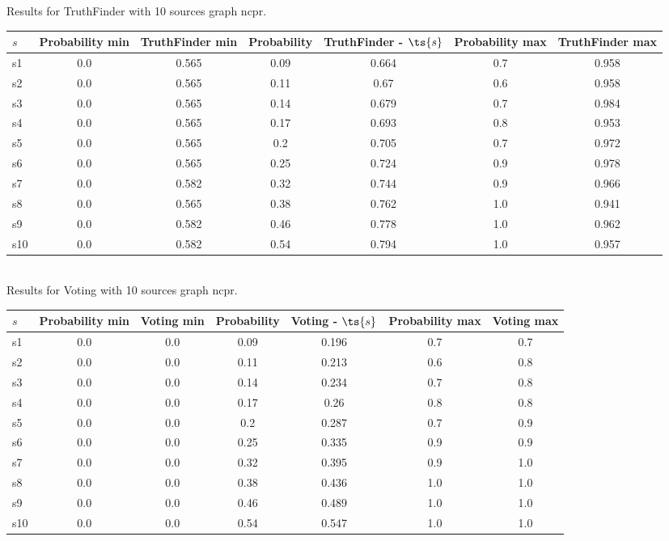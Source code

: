 \documentclass{article}
\begin{document}
\noindent Results for TruthFinder with 10 sources graph ncpr.

\noindent\begin{tabular}{|l|c|c|c|c|c|c|}
\hline
$s$& Probability min & TruthFinder min & Probability & TruthFinder - $\ts{s}$ & Probability max & TruthFinder max\\
\hline
s1 &0.0 & 0.565 & 0.09 & 0.664 & 0.7 & 0.958\\
\hline
s2 &0.0 & 0.565 & 0.11 & 0.67 & 0.6 & 0.958\\
\hline
s3 &0.0 & 0.565 & 0.14 & 0.679 & 0.7 & 0.984\\
\hline
s4 &0.0 & 0.565 & 0.17 & 0.693 & 0.8 & 0.953\\
\hline
s5 &0.0 & 0.565 & 0.2 & 0.705 & 0.7 & 0.972\\
\hline
s6 &0.0 & 0.565 & 0.25 & 0.724 & 0.9 & 0.978\\
\hline
s7 &0.0 & 0.582 & 0.32 & 0.744 & 0.9 & 0.966\\
\hline
s8 &0.0 & 0.565 & 0.38 & 0.762 & 1.0 & 0.941\\
\hline
s9 &0.0 & 0.582 & 0.46 & 0.778 & 1.0 & 0.962\\
\hline
s10 &0.0 & 0.582 & 0.54 & 0.794 & 1.0 & 0.957\\
\hline
\end{tabular}\\

\noindent Results for Voting with 10 sources graph ncpr.

\noindent\begin{tabular}{|l|c|c|c|c|c|c|}
\hline
$s$& Probability min & Voting min & Probability & Voting - $\ts{s}$ & Probability max & Voting max\\
\hline
s1 &0.0 & 0.0 & 0.09 & 0.196 & 0.7 & 0.7\\
\hline
s2 &0.0 & 0.0 & 0.11 & 0.213 & 0.6 & 0.8\\
\hline
s3 &0.0 & 0.0 & 0.14 & 0.234 & 0.7 & 0.8\\
\hline
s4 &0.0 & 0.0 & 0.17 & 0.26 & 0.8 & 0.8\\
\hline
s5 &0.0 & 0.0 & 0.2 & 0.287 & 0.7 & 0.9\\
\hline
s6 &0.0 & 0.0 & 0.25 & 0.335 & 0.9 & 0.9\\
\hline
s7 &0.0 & 0.0 & 0.32 & 0.395 & 0.9 & 1.0\\
\hline
s8 &0.0 & 0.0 & 0.38 & 0.436 & 1.0 & 1.0\\
\hline
s9 &0.0 & 0.0 & 0.46 & 0.489 & 1.0 & 1.0\\
\hline
s10 &0.0 & 0.0 & 0.54 & 0.547 & 1.0 & 1.0\\
\hline
\end{tabular}\\
\end{document}
